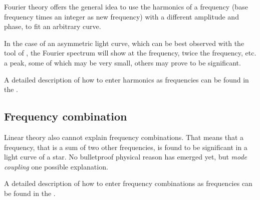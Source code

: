 Fourier theory offers the general idea to use the harmonics 
of a frequency (base frequency times an integer as new frequency)
with a different amplitude and phase, to fit an arbitrary curve.

In the case of an asymmetric light curve, which can be best observed
with the  tool of \period,
the Fourier spectrum will show at the frequency, twice the frequency,
etc. a peak, some of which may be very small, others may prove to be
significant.

A detailed description of how to enter harmonics as frequencies can
be found in the .

\subsection{Frequency combination}
Linear theory also cannot explain frequency combinations.
That means that a frequency, that is a sum of two other frequencies,
is found to be significant in a light curve of a star.
No bulletproof physical reason has emerged yet, but 
{\it mode coupling} one possible explanation.

A detailed description of how to enter frequency combinations as frequencies can
be found in the .



